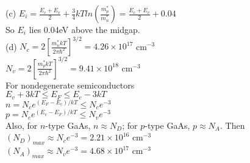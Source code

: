 \documentclass[11pt,oneside,a4paper]{article}
\begin{document}
\quad (c) \(E_i=\frac{E_c+E_v}{2}+\frac{3}{4}kTln\left(\frac{m_p^*}{m_n^*}\right)=\frac{E_c+E_v}{2}+0.04\) \\

\hspace{8.5mm} So \(E_i\) lies 0.04eV above the midgap. \\

\quad (d) \(N_c=2\left[\frac{m_n^*kT}{2\pi\hbar^2}\right]^{3/2}=4.26\times10^{17}\) cm\(^{-3}\) \\

\hspace{8.5mm} \(N_v=2\left[\frac{m_p^*kT}{2\pi\hbar^2}\right]^{3/2}=9.41\times10^{18}\) cm\(^{-3}\) \\

\hspace{8.5mm} For nondegenerate semiconductors \\

\hspace{8.5mm} \(E_v+3kT\leq E_F\leq E_c-3kT\) \\

\hspace{8.5mm} \(n=N_ce^{(E_F-E_c)/kT}\leq N_ce^{-3}\) \\

\hspace{8.5mm} \(p=N_ce^{(E_v-E_F)/kT}\leq N_ve^{-3}\) \\

\hspace{8.5mm} Also, for \(n\)-type GaAs, \(n\approx N_D\); for \(p\)-type GaAs, \(p\approx N_A\). Then \\

\hspace{8.5mm} \((N_D)_{max}\approx N_ce^{-3}=2.21\times10^{16}\) cm\(^{-3}\) \\

\hspace{8.5mm} \((N_A)_{max}\approx N_ve^{-3}=4.68\times10^{17}\) cm\(^{-3}\) \\
\end{document}

